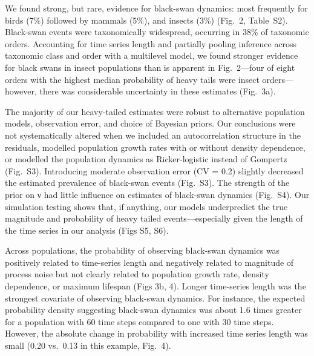 We found strong, but rare, evidence for black-swan dynamics: most frequently for birds (7\%) followed by mammals (5\%), and insects (3\%) (Fig.~2, Table~S2). Black-swan events were taxonomically widespread, occurring in 38\% of taxonomic orders. Accounting for time series length and partially pooling inference across taxonomic class and order with a multilevel model, we found stronger evidence for black swans in insect populations than is apparent in Fig.~2---four of eight orders with the highest median probability of heavy tails were insect orders---however, there was considerable uncertainty in these estimates (Fig.~3a).

The majority of our heavy-tailed estimates were robust to alternative population models, observation error, and choice of Bayesian priors. Our conclusions were not systematically altered when we included an autocorrelation structure in the residuals, modelled population growth rates with or without density dependence, or modelled the population dynamics as Ricker-logistic instead of Gompertz (Fig.~S3). Introducing moderate observation error (CV = 0.2) slightly decreased the estimated prevalence of black-swan events (Fig.~S3). The strength of the prior on ν had little influence on estimates of black-swan dynamics (Fig.~S4). Our simulation testing shows that, if anything, our models underpredict the true magnitude and probability of heavy tailed events---especially given the length of the time series in our analysis (Figs S5, S6).

Across populations, the probability of observing black-swan dynamics was positively related to time-series length and negatively related to magnitude of process noise but not clearly related to population growth rate, density dependence, or maximum lifespan (Figs 3b, 4). Longer time-series length was the strongest covariate of observing black-swan dynamics. For instance, the expected probability density suggesting black-swan dynamics was about 1.6 times greater for a population with 60 time steps compared to one with 30 time steps. However, the absolute change in probability with increased time series length was small (0.20 vs.~0.13 in this example, Fig.~4).

